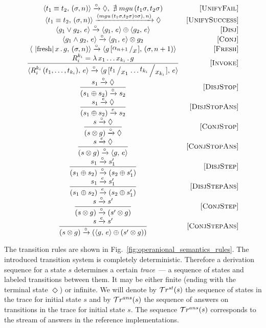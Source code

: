 \begin{figure*}
  \renewcommand{\arraystretch}{1.6}
  \[
  \begin{array}{cr}
    \taskst{t_1 \equiv t_2}{(\sigma, n)} \xrightarrow{\circ} \Diamond , \, \, \nexists\; mgu\,(t_1 \sigma, t_2 \sigma) &\ruleno{UnifyFail} \\
    \taskst{t_1 \equiv t_2}{(\sigma, n)} \xrightarrow{(mgu\,(t_1 \sigma, t_2 \sigma) \circ \sigma),\, n)} \Diamond & \ruleno{UnifySuccess} \\
    \taskst{g_1 \lor g_2}{e} \xrightarrow{\circ} \taskst{g_1}{e} \oplus \taskst{g_2}{e} & \ruleno{Disj} \\
    \taskst{g_1 \land g_2}{e} \xrightarrow{\circ} \taskst{g_1}{e} \otimes g_2 & \ruleno{Conj} \\
    \taskst{\mbox{\lstinline|fresh|}\, x\, .\, g}{(\sigma, n)} \xrightarrow{\circ} \taskst{g\,[\bigslant{\alpha_{n + 1}}{x}]}{( \sigma, n + 1)} & \ruleno{Fresh} \\
    \dfrac{R_i^{k_i}=\lambda\,x_1\dots x_{k_i}\,.\,g}{\taskst{R_i^{k_i}\,(t_1,\dots,t_{k_i})}{e} \xrightarrow{\circ} \taskst{g\,[\bigslant{t_1}{x_1}\dots\bigslant{t_{k_i}}{x_{k_i}}]}{e}} & \ruleno{Invoke}\\
    \dfrac{s_1 \xrightarrow{\circ} \Diamond}{(s_1 \oplus s_2) \xrightarrow{\circ} s_2} & \ruleno{DisjStop}\\
    \dfrac{s_1 \xrightarrow{e} \Diamond}{(s_1 \oplus s_2) \xrightarrow{e} s_2} & \ruleno{DisjStopAns}\\
    \dfrac{s \xrightarrow{\circ} \Diamond}{(s \otimes g) \xrightarrow{\circ} \Diamond} &\ruleno{ConjStop}\\
    \dfrac{s \xrightarrow{e} \Diamond}{(s \otimes g) \xrightarrow{\circ} \taskst{g}{e}}  & \ruleno{ConjStopAns}\\
    \dfrac{s_1 \xrightarrow{\circ} s'_1}{(s_1 \oplus s_2) \xrightarrow{\circ} (s_2 \oplus s'_1)} &\ruleno{DisjStep}\\
    \dfrac{s_1 \xrightarrow{e} s'_1}{(s_1 \oplus s_2) \xrightarrow{e} (s_2 \oplus s'_1)} &\ruleno{DisjStepAns}\\
    \dfrac{s \xrightarrow{\circ} s'}{(s \otimes g) \xrightarrow{\circ} (s' \otimes g)} &\ruleno{ConjStep}\\
    \dfrac{s \xrightarrow{e} s'}{(s \otimes g) \xrightarrow{\circ} (\taskst{g}{e} \oplus (s' \otimes g))} & \ruleno{ConjStepAns} 
  \end{array}
  \]
  \caption{Operational semantics of interleaving search}
  \label{fig:operanional_semantics_rules}
\end{figure*}

The transition rules are shown in Fig.~\ref{fig:operanional_semantics_rules}.
The introduced transition system is completely deterministic.
Therefore a derivation sequence for a state $s$ determines a certain \emph{trace}~--- a sequence of states and labeled transitions between
them.
It may be either finite (ending with the terminal state $\Diamond$) or infinite.
We will denote by $\mathcal{T}r^{st}(s)$ the sequence of states in the trace for initial state $s$ and by $\mathcal{T}r^{ans}(s)$ the sequence of answers on
transitions in the trace for initial state $s$.
The sequence $\mathcal{T}r^{ans}(s)$ corresponds to the stream of answers in the reference \mK implementations.
